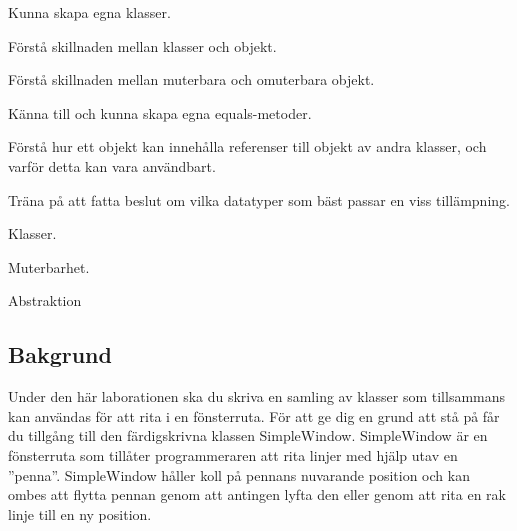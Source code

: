 

\Lab{\LabWeekSIX}

\begin{Goals}
\item Kunna skapa egna klasser.
\item Förstå skillnaden mellan klasser och objekt.
\item Förstå skillnaden mellan muterbara och omuterbara objekt.
\item Känna till och kunna skapa egna equals-metoder.
\item Förstå hur ett objekt kan innehålla referenser till objekt av andra klasser, och varför detta kan vara användbart.
\item Träna på att fatta beslut om vilka datatyper som bäst passar en viss tillämpning.
\end{Goals}

\begin{Preparations}
\item Klasser.
\item Muterbarhet.
\item Abstraktion


\end{Preparations}

\subsection{Bakgrund}

Under den här laborationen ska du skriva en samling av klasser som tillsammans kan användas för att rita i en fönsterruta. För att ge dig en grund att stå på får du tillgång till den färdigskrivna klassen SimpleWindow. SimpleWindow är en fönsterruta som tillåter programmeraren att rita linjer med hjälp utav en  ''penna''. SimpleWindow håller koll på pennans nuvarande position och kan ombes att flytta pennan genom att antingen lyfta den eller genom att rita en rak linje till en ny position.

